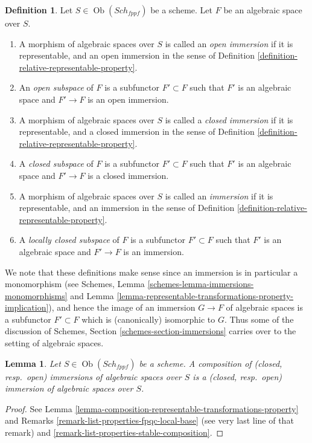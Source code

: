 \documentclass{stacks-project}
\theoremstyle{plain}
\newtheorem{lemma}[subsection]{Lemma}
\theoremstyle{definition}
\newtheorem{definition}[subsection]{Definition}
\theoremstyle{remark}
\numberwithin{equation}{subsection}
\def\Sch{\mathit{Sch}}
\def\Ob{\mathop{\mathrm{Ob}}\nolimits}
\begin{document}
\begin{definition}
\label{definition-immersion}
Let $S \in \Ob(\Sch_{fppf})$ be a scheme.
Let $F$ be an algebraic space over $S$.
\begin{enumerate}
\item A morphism of algebraic spaces over $S$
is called an {\it open immersion} if it is representable, and an open immersion
in the sense of Definition \ref{definition-relative-representable-property}.
\item An {\it open subspace} of $F$ is a subfunctor $F' \subset F$
such that $F'$ is an algebraic space and $F' \to F$ is an
open immersion.
\item A morphism of algebraic spaces over $S$
is called a {\it closed immersion} if it is representable, and a closed
immersion in the sense of
Definition \ref{definition-relative-representable-property}.
\item A {\it closed subspace} of $F$ is a subfunctor $F' \subset F$
such that $F'$ is an algebraic space and $F' \to F$ is a
closed immersion.
\item A morphism of algebraic spaces over $S$
is called an {\it immersion} if it is representable, and an immersion
in the sense of Definition \ref{definition-relative-representable-property}.
\item A {\it locally closed subspace} of $F$ is a subfunctor $F' \subset F$
such that $F'$ is an algebraic space and $F' \to F$ is an
immersion.
\end{enumerate}
\end{definition}

\noindent
We note that these definitions make sense since an immersion
is in particular a monomorphism (see
Schemes, Lemma \ref{schemes-lemma-immersions-monomorphisms}
and Lemma \ref{lemma-representable-transformations-property-implication}),
and hence the image of an
immersion $G \to F$ of algebraic spaces is a subfunctor $F' \subset F$
which is (canonically) isomorphic to $G$. Thus some of the discussion
of Schemes, Section \ref{schemes-section-immersions} carries over to the
setting of algebraic spaces.

\begin{lemma}
\label{lemma-composition-immersions}
Let $S \in \Ob(\Sch_{fppf})$ be a scheme.
A composition of (closed, resp.\ open) immersions of
algebraic spaces over $S$ is a (closed, resp.\ open)
immersion of algebraic spaces over $S$.
\end{lemma}

\begin{proof}
See Lemma \ref{lemma-composition-representable-transformations-property} and
Remarks \ref{remark-list-properties-fpqc-local-base} (see very last line of
that remark) and \ref{remark-list-properties-stable-composition}.
\end{proof}
\end{document}
